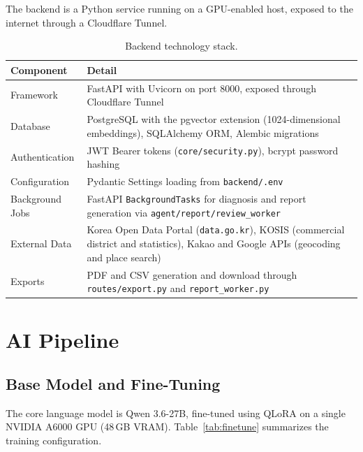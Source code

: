 \documentclass[11pt, a4paper]{article}
\begin{document}
The backend is a Python service running on a GPU-enabled host,
exposed to the internet through a Cloudflare Tunnel.

\begin{table}[H]
\centering
\caption{Backend technology stack.}
\label{tab:backend}
\renewcommand{\arraystretch}{1.35}
\begin{tabularx}{\textwidth}{M{3.0cm} L}
\toprule
\textbf{Component}  & \textbf{Detail} \\
\midrule
Framework       & FastAPI with Uvicorn on port 8000, exposed through
                  Cloudflare Tunnel \\
Database        & PostgreSQL with the pgvector extension (1024-dimensional
                  embeddings), SQLAlchemy ORM, Alembic migrations \\
Authentication  & JWT Bearer tokens (\texttt{core/security.py}),
                  bcrypt password hashing \\
Configuration   & Pydantic Settings loading from
                  \texttt{backend/.env} \\
Background Jobs & FastAPI \texttt{BackgroundTasks} for diagnosis and
                  report generation via
                  \texttt{agent/report/review\_worker} \\
External Data   & Korea Open Data Portal (\texttt{data.go.kr}),
                  KOSIS (commercial district and statistics),
                  Kakao and Google APIs (geocoding and place search) \\
Exports         & PDF and CSV generation and download through
                  \texttt{routes/export.py} and
                  \texttt{report\_worker.py} \\
\bottomrule
\end{tabularx}
\end{table}


\section{AI Pipeline}

\subsection{Base Model and Fine-Tuning}

The core language model is Qwen 3.6-27B, fine-tuned using QLoRA
on a single NVIDIA A6000 GPU (48\,GB VRAM).
Table~\ref{tab:finetune} summarizes the training configuration.
\end{document}
